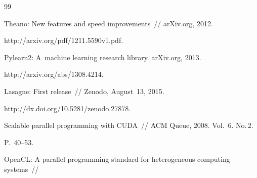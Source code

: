 {{\begin{thebibliography}{99}






Theano: New features and speed improvements~/\!\!/ arXiv.org, 2012. 


{\sf http://arxiv.org/pdf/1211.5590v1.pdf}.












Pylearn2: A~machine learning research library. arXiv.org, 2013. 


{\sf http://arxiv.org/abs/1308.4214}.









Lasagne: First release~/\!\!/ Zenodo, August~13,  2015. 


{\sf http://dx.doi.org/10.5281/zenodo.27878}.











Scalable parallel programming with CUDA~/\!\!/ ACM Queue, 2008. Vol.~6. No.\,2.  


P.~40--53.











OpenCL: A parallel programming standard for heterogeneous computing systems~/\!\!/ 



\end{thebibliography}}}
